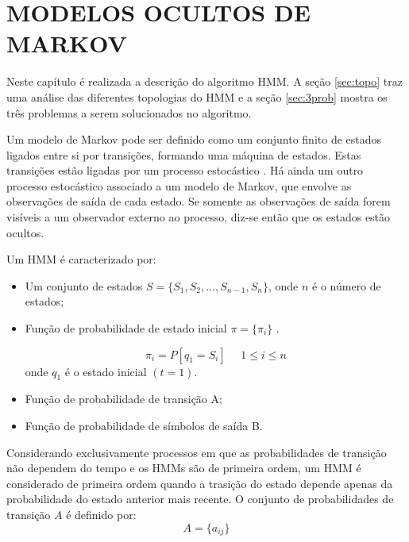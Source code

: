 \chapter{MODELOS OCULTOS DE MARKOV}
\thispagestyle{plain}
\label{chap:hmm}
Neste capítulo é realizada a descrição do algoritmo HMM. A seção \ref{sec:topo} traz uma análise das diferentes topologias do HMM e a seção \ref{sec:3prob} mostra os três problemas a serem solucionados no algoritmo.

\quad Um modelo de Markov pode ser definido como um conjunto finito de estados ligados entre si por transições, formando uma máquina de estados. Estas transições estão ligadas por um processo estocástico .  Há ainda um outro processo estocástico associado a um modelo de Markov, que envolve as observações de saída de cada estado. Se somente as observações de saída forem visíveis a um observador externo ao processo, diz-se então que os estados estão ocultos. %


Um HMM é caracterizado por:
\begin{itemize}

\item  Um conjunto de estados $ S =  \{S_1, S_2, \ldots, S_{n-1}, S_n\} $, onde $n$ é o número de estados;

\item Função de probabilidade de estado inicial $\pi = \{\pi_i\}$ .

\begin{equation}
\pi_i = P[q_1 = S_i ]~~\textrm{ }~ 1 \leq i \leq n 
\end{equation}
onde $q_1$ é o estado inicial $(t = 1)$.

\item Função de probabilidade de transição A;

\item Função de probabilidade de símbolos de saída B.

\end{itemize}

Considerando exclusivamente processos em que as probabilidades de transição não dependem do tempo e os HMMs são de primeira ordem, um HMM é considerado de primeira ordem quando a trasição do estado depende apenas da probabilidade do estado anterior mais recente. O conjunto de probabilidades de transição $A$ é definido por: 
 \begin{equation}
A = \{ a_{ij}\} 
\end{equation}

